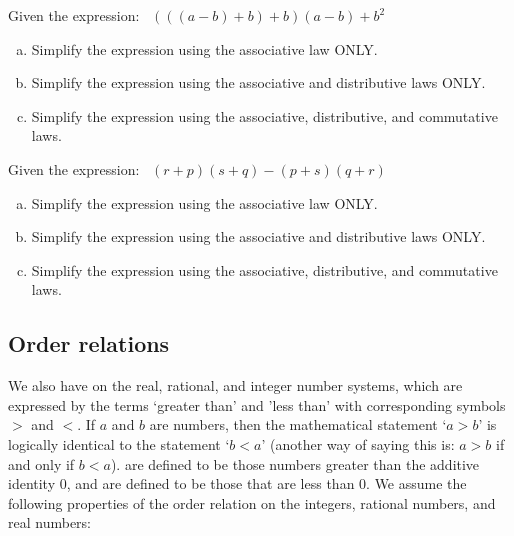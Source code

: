 \begin{exercise}{}
Given the expression:~
 $(((a-b)+b)+b)(a-b) + b^2$
\begin{enumerate}[(a)]
\item
Simplify the expression using the associative law ONLY.
\item
Simplify the expression using the associative and distributive laws ONLY.
\item
Simplify the expression using the associative, distributive, and commutative laws.
\end{enumerate}
\end{exercise}

\begin{exercise}{}
Given the expression:~
 $(r+p)(s+q) - (p+s)(q+r)$
\begin{enumerate}[(a)]
\item
Simplify the expression using the associative law ONLY.
\item
Simplify the expression using the associative and distributive laws ONLY.
\item
Simplify the expression using the associative, distributive, and commutative laws.
\end{enumerate}
\end{exercise}



\subsection{Order relations}\label{subsec:orderprop}
We also have  on the real, rational, and integer number systems, which are expressed by the terms `greater than'  and 'less than' with corresponding symbols $>$ and $<$. If $a$ and $b$ are numbers, then  the mathematical statement `$a > b$' is logically identical to the statement  `$b<a$' (another way of saying this is: $a > b$ if and only if $b < a$).  are defined to be those numbers greater than the additive identity 0, and  are defined to be those that  are less than 0. We assume the following properties of the order relation on the integers, rational numbers, and real numbers:

